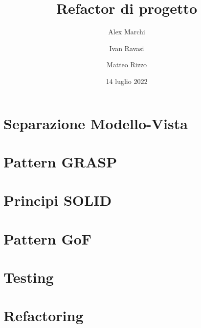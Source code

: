 \documentclass{beamer}
\begin{document}
    \title{Refactor di progetto}
    \author{Alex Marchi \and Ivan Ravasi \and Matteo Rizzo}
    \date{14 luglio 2022}

    \frame{\titlepage}

    


    \section{Separazione Modello-Vista}
    

    \section{Pattern GRASP}
    

    \section{Principi SOLID}
    

    \section{Pattern GoF}
    

    \section{Testing}
    

    \section{Refactoring}
    
\end{document}
